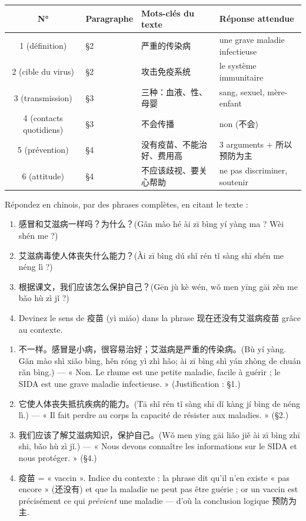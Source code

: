 \documentclass[11pt]{article}
\begin{document}
\begin{center}
\begin{tabularx}{\linewidth}{|c|X|X|X|}
\hline
\rowcolor{popblueL} N° & Paragraphe & Mots-clés du texte & Réponse attendue \\
\hline
1 (définition) & §2 & 严重的传染病 & une grave maladie infectieuse \\
\hline
2 (cible du virus) & §2 & 攻击免疫系统 & le système immunitaire \\
\hline
3 (transmission) & §3 & 三种：血液、性、母婴 & sang, sexuel, mère-enfant \\
\hline
4 (contacts quotidiens) & §3 & 不会传播 & non (不会) \\
\hline
5 (prévention) & §4 & 没有疫苗、不能治好、费用高 & 3 arguments + 所以预防为主 \\
\hline
6 (attitude) & §4 & 不应该歧视、要关心帮助 & ne pas discriminer, soutenir \\
\hline
\end{tabularx}
\end{center}

\begin{exercice}
Répondez en chinois, par des phrases complètes, en citant le texte :
\begin{enumerate}
\item 感冒和艾滋病一样吗？为什么？(Gǎn mào hé ài zī bìng yí yàng ma ? Wèi shén me ?)
\item 艾滋病毒使人体丧失什么能力？(Ài zī bìng dú shǐ rén tǐ sàng shī shén me néng lì ?)
\item 根据课文，我们应该怎么保护自己？(Gēn jù kè wén, wǒ men yīng gāi zěn me bǎo hù zì jǐ ?)
\item Devinez le sens de 疫苗 (yì miáo) dans la phrase 现在还没有艾滋病疫苗 grâce au contexte.
\end{enumerate}
\end{exercice}

\begin{corrige}
\begin{enumerate}
\item 不一样。感冒是小病，很容易治好；艾滋病是严重的传染病。(Bù yí yàng. Gǎn mào shì xiǎo bìng, hěn róng yì zhì hǎo; ài zī bìng shì yán zhòng de chuán rǎn bìng.) — « Non. Le rhume est une petite maladie, facile à guérir ; le SIDA est une grave maladie infectieuse. » (Justification : §1.)
\item 它使人体丧失抵抗疾病的能力。(Tā shǐ rén tǐ sàng shī dǐ kàng jí bìng de néng lì.) — « Il fait perdre au corps la capacité de résister aux maladies. » (§2.)
\item 我们应该了解艾滋病知识，保护自己。(Wǒ men yīng gāi liǎo jiě ài zī bìng zhī shi, bǎo hù zì jǐ.) — « Nous devons connaître les informations sur le SIDA et nous protéger. » (§4.)
\item 疫苗 = « vaccin ». Indice du contexte : la phrase dit qu'il n'en existe « pas encore » (还没有) et que la maladie ne peut pas être guérie ; or un vaccin est précisément ce qui \emph{prévient} une maladie — d'où la conclusion logique 预防为主.
\end{enumerate}
\end{corrige}
\end{document}

